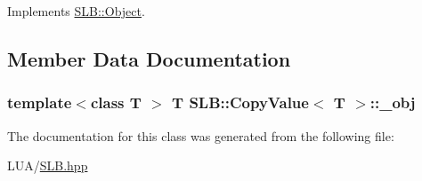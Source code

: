 Implements \hyperlink{classSLB_1_1Object_a3dddf6a764c19ed37f6af797f0b0b453}{S\+L\+B\+::\+Object}.



\subsection{Member Data Documentation}
\subsubsection[{\texorpdfstring{\+\_\+obj}{_obj}}]{\setlength{\rightskip}{0pt plus 5cm}template$<$class T $>$ T {\bf S\+L\+B\+::\+Copy\+Value}$<$ T $>$\+::\+\_\+obj\hspace{0.3cm}{\ttfamily [private]}}\hypertarget{classSLB_1_1CopyValue_a439135e1afd16620e6b970e8d7df4bbe}{}\label{classSLB_1_1CopyValue_a439135e1afd16620e6b970e8d7df4bbe}


The documentation for this class was generated from the following file\+:\begin{DoxyCompactItemize}
\item 
L\+U\+A/\hyperlink{SLB_8hpp}{S\+L\+B.\+hpp}\end{DoxyCompactItemize}
